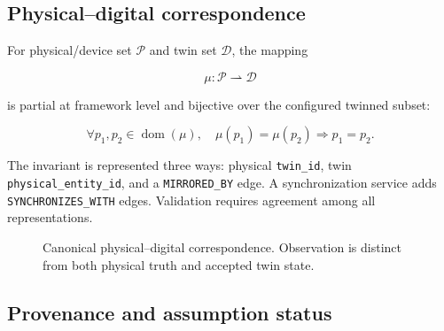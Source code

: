 ﻿\documentclass[10pt,a4paper,twocolumn]{article}
\newcommand{\code}[1]{\texttt{#1}}
\begin{document}
\subsection{Physical--digital correspondence}

For physical/device set \(\mathcal{P}\) and twin set \(\mathcal{D}\), the mapping

\begin{equation}
\mu:\mathcal{P}\rightharpoonup\mathcal{D}
\end{equation}

is partial at framework level and bijective over the configured twinned subset:

\begin{equation}
\forall p_1,p_2\in\operatorname{dom}(\mu),\quad \mu(p_1)=\mu(p_2)\Rightarrow p_1=p_2.
\label{eq:twinunique}
\end{equation}

The invariant is represented three ways: physical \code{twin\_id}, twin \code{physical\_entity\_id}, and a \code{MIRRORED\_BY} edge. A synchronization service adds \code{SYNCHRONIZES\_WITH} edges. Validation requires agreement among all representations.

\begin{figure}[t]
\centering
{}
\caption{Canonical physical--digital correspondence. Observation is distinct from both physical truth and accepted twin state.}
\label{fig:twinmapping}
\end{figure}

\subsection{Provenance and assumption status}
\end{document}
